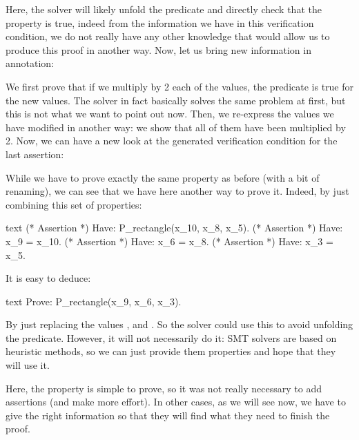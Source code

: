 Here, the solver will likely unfold the predicate and directly check that the
property is true, indeed from the information we have in this verification
condition, we do not really have any other knowledge that would allow us to
produce this proof in another way. Now, let us bring new information in
annotation:






We first prove that if we multiply by 2 each of the values, the predicate
is true for the new values. The solver in fact basically solves the same
problem at first, but this is not what we want to point out now. Then, we
re-express the values we have modified in another way: we show that all of them
have been multiplied by 2. Now, we can have a new look at the generated
verification condition for the last assertion:






While we have to prove exactly the same property as before (with a bit of
renaming), we can see that we have here another way to prove it. Indeed, by
just combining this set of properties:


\begin{CodeBlock}{text}
(* Assertion *)
Have: P_rectangle(x_10, x_8, x_5).
(* Assertion *)
Have: x_9 = x_10.
(* Assertion *)
Have: x_6 = x_8.
(* Assertion *)
Have: x_3 = x_5.
\end{CodeBlock}


It is easy to deduce:


\begin{CodeBlock}{text}
Prove: P_rectangle(x_9, x_6, x_3).
\end{CodeBlock}


By just replacing the values ,  and
. So the solver could use this to avoid unfolding the
predicate. However, it will not necessarily do it: SMT solvers are based on
heuristic methods, so we can just provide them properties and hope that they
will use it.



Here, the property is simple to prove, so it was not really necessary to add
assertions (and make more effort). In other cases, as we will see now, we have
to give the right information so that they will find what they need to finish
the proof.



